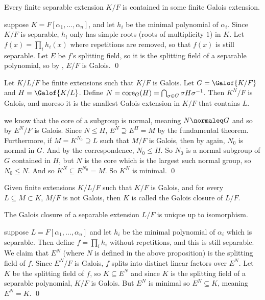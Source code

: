 \bprop

    Every finite separable extension $K/F$ is contained in some finite Galois extension.

\eprop

\Proof suppose $K=F[\alpha_1,\dots,\alpha_n]$, and let $h_i$ be the minimal polynomial of $\alpha_i$.
Since $K/F$ is separable, $h_i$ only has simple roots (roots of multiplicity $1$) in $K$.
Let $f(x)=\prod_ih_i(x)$ where repetitions are removed, so that $f(x)$ is still separable.
Let $E$ be $f$'s splitting field, so it is the splitting field of a separable polynomial, so by , $E/F$ is Galois.
\qed

\bprop

    Let $K/L/F$ be finite extensions such that $K/F$ is Galois.
    Let $G=\Galof{K/F}$ and $H=\Galof{K/L}$.
    Define $N={\rm core}_G(H)=\bigcap_{\sigma\in G}\sigma H\sigma^{-1}$.
    Then $K^N/F$ is Galois, and moreso it is the smallest Galois extension in $K/F$ that contains $L$.

\eprop

\Proof we know that the core of a subgroup is normal, meaning $N\normaleq G$ and so by  $E^N/F$ is Galois.
Since $N\leq H$, $E^N\supseteq E^H=M$ by the fundamental theorem.
Furthermore, if $M=K^{N_0}\supseteq L$ such that $M/F$ is Galois, then by  again, $N_0$ is normal in $G$.
And by the correspondence, $N_0\leq H$.
So $N_0$ is a normal subgroup of $G$ contained in $H$, but $N$ is the core which is the largest such normal group, so $N_0\leq N$.
And so $K^N\subseteq E^{N_0}=M$.
So $K^N$ is minimal.
\qed

\bdefn

    Given finite extensions $K/L/F$ such that $K/F$ is Galois, and for every $L\subseteq M\subset K$, $M/F$ is not Galois, then $K$ is called the {\emphcolor Galois closure} of $L/F$.

\edefn

\bprop

    The Galois closure of a separable extension $L/F$ is unique up to isomorphism.

\eprop

\Proof suppose $L=F[\alpha_1,\dots,\alpha_n]$ and let $h_i$ be the minimal polynomial of $\alpha_i$ which is separable.
Then define $f=\prod_ih_i$ without repetitions, and this is still separable.
We claim that $E^N$ (where $N$ is defined in the above proposition) is the splitting field of $f$.
Since $E^N/F$ is Galois, $f$ splits into distinct linear factors over $E^N$.
Let $K$ be the splitting field of $f$, so $K\subseteq E^N$ and since $K$ is the splitting field of a separable polynomial, $K/F$ is Galois.
But $E^N$ is minimal so $E^N\subseteq K$, meaning $E^N=K$.
\qed

